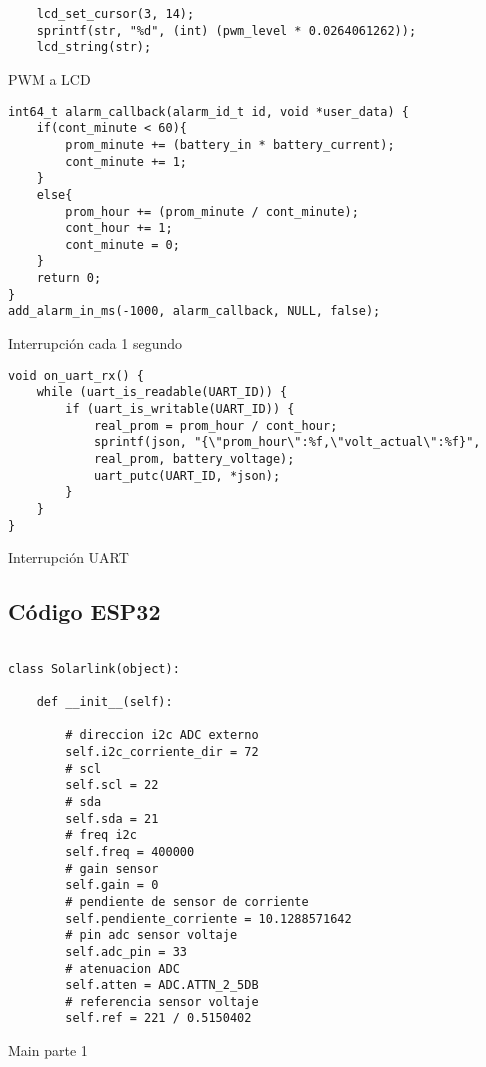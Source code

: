 \begin{listing}[H]
\begin{verbatim}
    lcd_set_cursor(3, 14);
    sprintf(str, "%d", (int) (pwm_level * 0.0264061262));
    lcd_string(str);
\end{verbatim}
\caption{PWM a LCD}
\label{Listing 6}
\end{listing}

\begin{listing}[H]
\begin{verbatim}
int64_t alarm_callback(alarm_id_t id, void *user_data) {
    if(cont_minute < 60){
        prom_minute += (battery_in * battery_current);
        cont_minute += 1;
    }
    else{
        prom_hour += (prom_minute / cont_minute);
        cont_hour += 1;
        cont_minute = 0;
    }
    return 0;
}
add_alarm_in_ms(-1000, alarm_callback, NULL, false);
\end{verbatim}
\caption{Interrupción cada 1 segundo}
\label{Listing 7}
\end{listing}

\begin{listing}[H]
\begin{verbatim}
void on_uart_rx() {
    while (uart_is_readable(UART_ID)) {
        if (uart_is_writable(UART_ID)) {
            real_prom = prom_hour / cont_hour;
            sprintf(json, "{\"prom_hour\":%f,\"volt_actual\":%f}",
            real_prom, battery_voltage);
            uart_putc(UART_ID, *json);
        }
    }
}
\end{verbatim}
\caption{Interrupción UART}
\label{Listing 8}
\end{listing}

\subsection{Código ESP32}

\begin{listing}[H]
\begin{verbatim}

class Solarlink(object):

    def __init__(self):

        # direccion i2c ADC externo
        self.i2c_corriente_dir = 72
        # scl
        self.scl = 22
        # sda
        self.sda = 21
        # freq i2c
        self.freq = 400000
        # gain sensor
        self.gain = 0
        # pendiente de sensor de corriente
        self.pendiente_corriente = 10.1288571642
        # pin adc sensor voltaje
        self.adc_pin = 33
        # atenuacion ADC
        self.atten = ADC.ATTN_2_5DB
        # referencia sensor voltaje
        self.ref = 221 / 0.5150402

\end{verbatim}
\caption{Main parte 1}
\label{main-1}
\end{listing}


